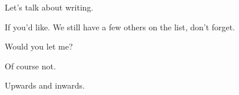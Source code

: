 \label{ally:17}
\begin{paracol}{2}
  \begin{leftcolumn}

\noindent Let's talk about writing.

\begin{ally}
If you'd like. We still have a few others on the list, don't forget.
\end{ally}
Would you let me?

\begin{ally}
Of course not.
\end{ally}
Upwards and inwards.
\newpage

\end{leftcolumn}
\end{paracol}
